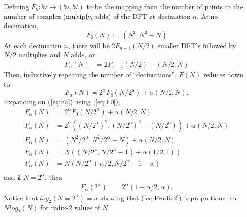 \documentclass{article}
\begin{document}
Defining $F_n : \mathbb{W} \mapsto (\mathbb{W}, \mathbb{W})$ to be the mapping from the number of points to the number of complex (multiply, adds) of the DFT at decimation $n$. At no decimation,
%
\begin {equation} \label {eq:F0}
F_0 (N) := (N^2, N^2 - N)
\end {equation}
%
At each decimation $n$, there will be $2 F_{n-1}(N/2)$ smaller DFT's followed by $N/2$ multiplies and $N$ adds, or
%
\begin {equation} \label {eq:Fn}
\begin {aligned}
F_n (N) &= 2 F_{n - 1} (N/2) + (N/2, N)
\end {aligned}
\end {equation}
%
Then, inductively repeating the number of ``decimations'', $F(N)$ reduces down to
%
\begin {equation} \label {eq:Fa}
F_\alpha (N) = 2^\alpha F_0 (N/2^\alpha) + \alpha (N/2, N).
\end {equation}
%
Expanding on (\ref{eq:Fa}) using (\ref{eq:F0}),
%
\begin {equation}
\begin {aligned}
F_\alpha (N) &= 2^\alpha F_0 (N/2^\alpha) + \alpha (N/2, N) \\
F_\alpha (N) &= 2^\alpha ((N/2^\alpha)^2, (N/2^\alpha)^2 - (N/2^\alpha)) + \alpha (N/2, N) \\
F_\alpha (N) &= (N^2/2^\alpha, N^2/2^\alpha - N) + \alpha (N/2, N) \\
F_\alpha (N) &= N \left((N/2^\alpha, N/2^\alpha - 1) + \alpha (1/2, 1)\right) \\
F_\alpha (N) &= N (N/2^\alpha + \alpha/2, N/2^\alpha - 1 + \alpha) \\
\end {aligned}
\end {equation}
%
and if $N = 2^\alpha$, then
%
\begin {equation} \label {eq:Fradix2}
\begin {aligned}
F_\alpha (2^\alpha) &= 2^{\alpha} (1 + \alpha/2, \alpha).
\end {aligned}
\end {equation}
%
Notice that $log_2 (N = 2^\alpha) = \alpha$ showing that (\ref{eq:Fradix2}) is proportional to $N log_2 (N)$ for radix-$2$ values of $N$.
%
\end{document}

